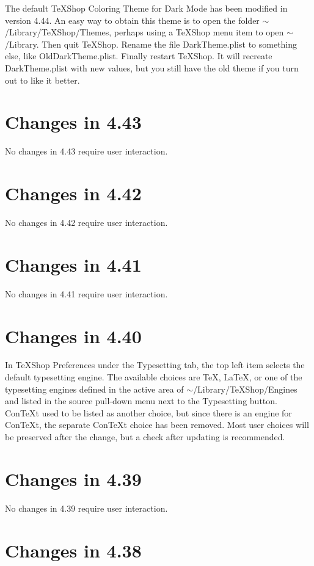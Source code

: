 \documentclass[11pt, oneside]{amsart}
\begin{document}
The default TeXShop Coloring Theme for Dark Mode has been modified in version 4.44. An easy way to obtain this theme is to open the folder $\sim$/Library/TeXShop/Themes, perhaps using a TeXShop menu item to open $\sim$/Library.  Then quit TeXShop. Rename the file DarkTheme.plist to something else, like OldDarkTheme.plist. Finally restart TeXShop. It will recreate DarkTheme.plist with new values, but you still have the old theme if you turn out to like it better.

\section{Changes in 4.43}

No changes in 4.43 require user interaction.

\section{Changes in 4.42}

No changes in 4.42 require user interaction.

\section{Changes in 4.41}

No changes in 4.41 require user interaction.


\section{Changes in 4.40}

In TeXShop Preferences under the Typesetting tab, the top left item selects the default typesetting engine. The available choices are TeX, LaTeX, or one of the typesetting engines defined in the active area of $\sim$/Library/TeXShop/Engines and listed in the source pull-down menu next to the Typesetting button.  ConTeXt used to be listed as another choice, but since there is an engine for ConTeXt, the separate ConTeXt choice has been removed. Most user choices will be preserved after the change, but a check after updating is recommended.


\section{Changes in 4.39}

No changes in 4.39 require user interaction.

\section{Changes in 4.38}
\end{document}
